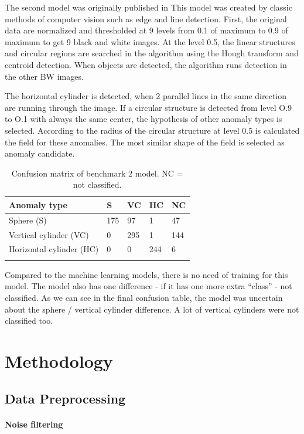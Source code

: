 \documentclass{article}
\begin{document}
The second model was originally published in \cite{lenka}
This model was created by classic methods of computer vision such as
edge and line detection. First, the original data are normalized and
thresholded at 9 levels from 0.1 of maximum to 0.9 of maximum to get 9
black and white images. At the level 0.5, the linear structures and
circular regions are searched in the algorithm using the Hough transform
and centroid detection. When objects are detected, the algorithm runs
detection in the other BW images.

The horizontal cylinder is detected, when 2 parallel lines in the same
direction are running through the image. If a circular structure is
detected from level O.9 to O.1 with always the same center, the
hypothesis of other anomaly types is selected. According to the radius
of the circular structure at level 0.5 is calculated the field for these
anomalies. The most similar shape of the field is selected as anomaly
candidate.

\begin{longtable}[c]{@{}lllll@{}}
\toprule
Anomaly type & S & VC & HC & NC\tabularnewline
\midrule
\endhead
Sphere (S) & 175 & 97 & 1 & 47\tabularnewline
Vertical cylinder (VC) & 0 & 295 & 1 & 144\tabularnewline
Horizontal cylinder (HC) & 0 & 0 & 244 & 6\tabularnewline
\bottomrule
\caption[Confusion matrix of benchmark 2 model]{Confusion matrix of benchmark 2 model. NC = not classified.}
\label{tab:ConfusionMatrixBenchmark2}
\end{longtable}


Compared to the machine learning models, there is no need of training
for this model. The model also has one difference - if it has one more
extra ``class'' - not classified. As we can see in the final confusion
table, the model was uncertain about the sphere / vertical cylinder
difference. A lot of vertical cylinders were not classified too.

\section{Methodology}\label{methodology}

\subsection{Data Preprocessing}\label{data-preprocessing}

\paragraph{Noise filtering}\label{noise-filtering}
\end{document}
